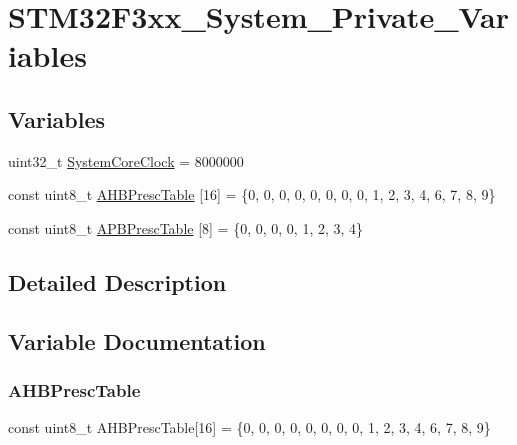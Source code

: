 \hypertarget{group___s_t_m32_f3xx___system___private___variables}{}\section{S\+T\+M32\+F3xx\+\_\+\+System\+\_\+\+Private\+\_\+\+Variables}
\label{group___s_t_m32_f3xx___system___private___variables}
\subsection*{Variables}
\begin{DoxyCompactItemize}
\item 
uint32\+\_\+t \mbox{\hyperlink{group___s_t_m32_f3xx___system___private___variables_gaa3cd3e43291e81e795d642b79b6088e6}{System\+Core\+Clock}} = 8000000
\item 
const uint8\+\_\+t \mbox{\hyperlink{group___s_t_m32_f3xx___system___private___variables_ga6e1d9cd666f0eacbfde31e9932a93466}{A\+H\+B\+Presc\+Table}} \mbox{[}16\mbox{]} = \{0, 0, 0, 0, 0, 0, 0, 0, 1, 2, 3, 4, 6, 7, 8, 9\}
\item 
const uint8\+\_\+t \mbox{\hyperlink{group___s_t_m32_f3xx___system___private___variables_ga5b4f8b768465842cf854a8f993b375e9}{A\+P\+B\+Presc\+Table}} \mbox{[}8\mbox{]} = \{0, 0, 0, 0, 1, 2, 3, 4\}
\end{DoxyCompactItemize}


\subsection{Detailed Description}


\subsection{Variable Documentation}
\mbox{\label{group___s_t_m32_f3xx___system___private___variables_ga6e1d9cd666f0eacbfde31e9932a93466}} 
\subsubsection{\texorpdfstring{AHBPrescTable}{AHBPrescTable}}
{\footnotesize\ttfamily const uint8\+\_\+t A\+H\+B\+Presc\+Table\mbox{[}16\mbox{]} = \{0, 0, 0, 0, 0, 0, 0, 0, 1, 2, 3, 4, 6, 7, 8, 9\}}

